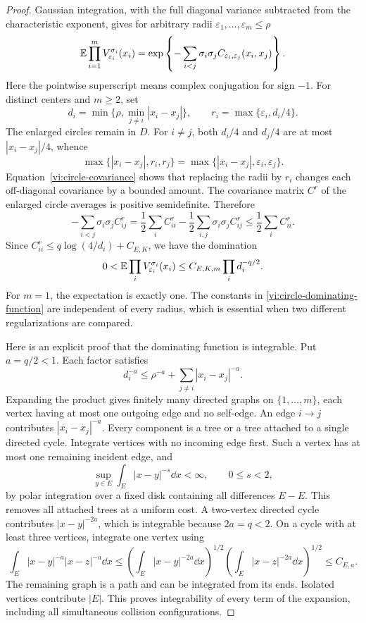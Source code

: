 \begin{proof}
Gaussian integration, with the full diagonal variance subtracted from the
characteristic exponent, gives for arbitrary radii
$\varepsilon_1,\ldots,\varepsilon_m\leq\rho$
\begin{equation}\label{vi:circle-mixed-kernel}
 \mathbb E\prod_{i=1}^m V_{\varepsilon_i}^{\sigma_i}(x_i)
 =\exp\left\{-\sum_{i<j}\sigma_i\sigma_j
                     C_{\varepsilon_i,\varepsilon_j}(x_i,x_j)\right\}.
\end{equation}
Here the pointwise superscript means complex conjugation for sign $-1$.
For distinct centers and $m\geq2$, set
\[
 d_i=\min\{\rho,\min_{j\ne i}|x_i-x_j|\},\qquad
 r_i=\max\{\varepsilon_i,d_i/4\}.
\]
The enlarged circles remain in $D$.
For $i\ne j$, both $d_i/4$ and $d_j/4$ are at most
$|x_i-x_j|/4$, whence
\[
 \max\{|x_i-x_j|,r_i,r_j\}
 =\max\{|x_i-x_j|,\varepsilon_i,\varepsilon_j\}.
\]
Equation~\eqref{vi:circle-covariance} shows that replacing the radii by
$r_i$ changes each off-diagonal covariance by a bounded amount.
The covariance matrix $C^r$ of the enlarged circle averages is positive
semidefinite.  Therefore
\[
 -\sum_{i<j}\sigma_i\sigma_j C^r_{ij}
 =\frac12\sum_i C^r_{ii}
       -\frac12\sum_{i,j}\sigma_i\sigma_j C^r_{ij}
 \leq\frac12\sum_i C^r_{ii}.
\]
Since $C^r_{ii}\leq q\log(4/d_i)+C_{E,K}$, we have the domination
\begin{equation}\label{vi:circle-dominating-function}
 0<\mathbb E\prod_i V_{\varepsilon_i}^{\sigma_i}(x_i)
       \leq C_{E,K,m}\prod_i d_i^{-q/2}.
\end{equation}
For $m=1$, the expectation is exactly one.  The constants in
\eqref{vi:circle-dominating-function} are independent of every radius,
which is essential when two different regularizations are compared.

Here is an explicit proof that the dominating function is integrable.
Put $a=q/2<1$.  Each factor satisfies
\[
 d_i^{-a}\leq\rho^{-a}+\sum_{j\ne i}|x_i-x_j|^{-a}.
\]
Expanding the product gives finitely many directed graphs on
$\{1,\ldots,m\}$, each vertex having at most one outgoing edge and no
self-edge.  An edge $i\to j$ contributes $|x_i-x_j|^{-a}$.
Every component is a tree or a tree attached to a single directed cycle.
Integrate vertices with no incoming edge first.  Such a vertex has at most
one remaining incident edge, and
\[
 \sup_{y\in E}\int_E |x-y|^{-s}\dd x<\infty,\qquad 0\leq s<2,
\]
by polar integration over a fixed disk containing all differences $E-E$.
This removes all attached trees at a uniform cost.  A two-vertex directed
cycle contributes $|x-y|^{-2a}$, which is integrable because $2a=q<2$.
On a cycle with at least three vertices, integrate one vertex using
\[
 \int_E|x-y|^{-a}|x-z|^{-a}\dd x
 \leq\left(\int_E|x-y|^{-2a}\dd x\right)^{1/2}
       \left(\int_E|x-z|^{-2a}\dd x\right)^{1/2}\leq C_{E,a}.
\]
The remaining graph is a path and can be integrated from its ends.
Isolated vertices contribute $|E|$.  This proves integrability of every
term of the expansion, including all simultaneous collision configurations.


\end{proof}
